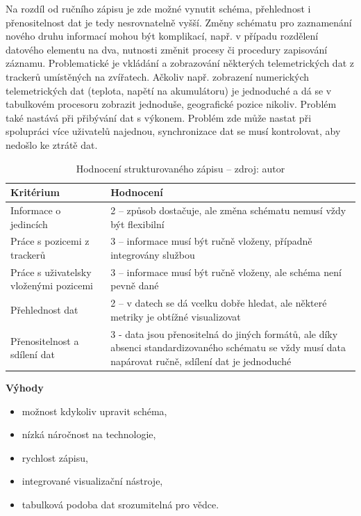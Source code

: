 Na rozdíl od ručního zápisu je zde možné vynutit schéma, přehlednost i přenositelnost dat je tedy nesrovnatelně vyšší. Změny schématu pro zaznamenání nového druhu informací mohou být komplikací, např. v případu rozdělení datového elementu na dva, nutnosti změnit procesy či procedury zapisování záznamu. Problematické je vkládání a zobrazování některých telemetrických dat z trackerů umístěných na zvířatech. Ačkoliv např. zobrazení numerických telemetrických dat (teplota, napětí na akumulátoru) je jednoduché a dá se v tabulkovém procesoru zobrazit jednoduše, geografické pozice nikoliv. Problém také nastává při přibývání dat s výkonem. Problém zde může nastat při spolupráci více uživatelů najednou, synchronizace dat se musí kontrolovat, aby nedošlo ke ztrátě dat.

\begin{table}[H]
	\begin{tabularx}{\textwidth}{ | X | X | }
		\hline
		Kritérium                              & Hodnocení \\
		\hline			
		Informace o jedincích                  & 2 -- způsob dostačuje, ale změna schématu nemusí vždy být flexibilní          \\
		\hline
		Práce s pozicemi z trackerů            & 3 -- informace musí být ručně vloženy, případně integrovány službou          \\
		\hline
		Práce s uživatelsky vloženými pozicemi & 3 -- informace musí být ručně vloženy, ale schéma není pevně dané          \\
		\hline
		Přehlednost dat                        & 2 -- v datech se dá vcelku dobře hledat, ale některé metriky je obtížné visualizovat          \\
		\hline
		Přenositelnost a sdílení dat           & 3 - data jsou přenositelná do jiných formátů, ale díky absenci standardizovaného schématu se vždy musí data napárovat ručně, sdílení dat je jednoduché          \\
		\hline	
	\end{tabularx}
	\caption[Hodnocení strukturovaného zápisu]{Hodnocení strukturovaného zápisu -- zdroj: autor}
\end{table}

\textbf{Výhody}
\nolisttopbreak
\begin{itemize}
	\item možnost kdykoliv upravit schéma,
	\item nízká náročnost na technologie,
	\item rychlost zápisu,
	\item integrované visualizační nástroje,
	\item tabulková podoba dat srozumitelná pro vědce.
\end{itemize}

